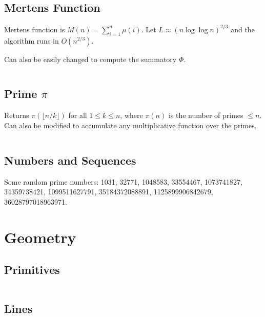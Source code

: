 \documentclass[8pt,a4paper,landscape,oneside]{amsart}
\newcommand{\code}[1]{\inputminted[fontsize=\normalsize,baselinestretch=1]{cpp}{_code/#1}}
\newif\ifverbose
\begin{document}
\begin{multicols*}{3}
    \subsection{Mertens Function}
        Mertens function is $M(n) = \sum_{i=1}^n \mu(i)$. Let $L\approx
        (n\log{\log{n}})^{2/3}$ and the algorithm runs in $O(n^{2/3})$.
        \ifverbose
        \else
            Can also be easily changed to compute the summatory $\Phi$.
        \fi
        \code{mathematics/mertens.cpp}
    \ifverbose
    \subsection{Summatory Phi}
        The summatory phi function $\Phi(n) = \sum_{i=1}^n \phi(i)$. Let $L\approx
        (n\log{\log{n}})^{2/3}$ and the algorithm runs in $O(n^{2/3})$.
        \code{mathematics/summatory_phi.cpp}
    \fi

    \subsection{Prime $\pi$}
        Returns $\pi\left(\lfloor n/k\rfloor\right)$ for all $1\leq k \leq n$,
        where $\pi(n)$ is the number of primes $\leq n$. Can also be modified
        to accumulate any multiplicative function over the primes.
        \code{mathematics/primepi.cpp}

    \subsection{Numbers and Sequences}
        Some random prime numbers: 1031, 32771, 1048583, 33554467,
        1073741827, 34359738421, 1099511627791, 35184372088891,
        1125899906842679, 36028797018963971.

\section{Geometry}
    \subsection{Primitives}
        \ifverbose
        Geometry primitives.
        \fi
        \code{geometry/primitives.cpp}
    \subsection{Lines}
        \ifverbose
        Line related functions.
        \fi
        \code{geometry/lines.cpp}

\end{multicols*}
\end{document}
